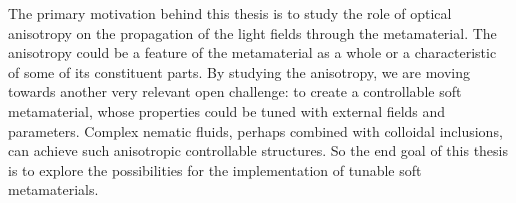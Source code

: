 \documentclass[a4paper,11pt]{article}
\begin{document}
The primary motivation behind this thesis is to study the role of optical anisotropy on the propagation of the light fields through the metamaterial.
The anisotropy could be a feature of the metamaterial as a whole or a characteristic of some of its constituent parts. 
By studying the anisotropy, we are moving towards another very relevant open challenge: to create a controllable soft metamaterial, whose properties could be tuned with external fields and parameters. 
Complex nematic fluids, perhaps combined with colloidal inclusions, can achieve such anisotropic controllable structures. 
So the end goal of this thesis is to explore the possibilities for the implementation of tunable soft metamaterials. 

% 
% 
% 
% 




\end{document}
